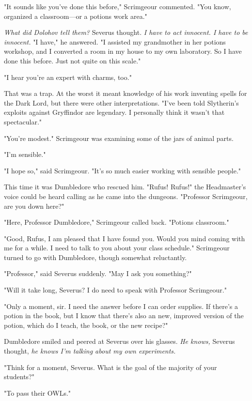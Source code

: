 "It sounds like you've done this before," Scrimgeour commented. "You know, organized a classroom—or a potions work area."

\emph{What did Dolohov tell them?} Severus thought. \emph{I have to act innocent. I have to be innocent.} "I have," he answered. "I assisted my grandmother in her potions workshop, and I converted a room in my house to my own laboratory. So I have done this before. Just not quite on this scale."

"I hear you're an expert with charms, too."

That was a trap. At the worst it meant knowledge of his work inventing spells for the Dark Lord, but there were other interpretations. "I've been told Slytherin's exploits against Gryffindor are legendary. I personally think it wasn't that spectacular."

"You're modest." Scrimgeour was examining some of the jars of animal parts.

"I'm sensible."

"I hope so," said Scrimgeour. "It's so much easier working with sensible people."

This time it was Dumbledore who rescued him. "Rufus! Rufus!" the Headmaster's voice could be heard calling as he came into the dungeons. "Professor Scrimgeour, are you down here?"

"Here, Professor Dumbledore," Scrimgeour called back. "Potions classroom."

"Good, Rufus, I am pleased that I have found you. Would you mind coming with me for a while. I need to talk to you about your class schedule." Scrimgeour turned to go with Dumbledore, though somewhat reluctantly.

"Professor," said Severus suddenly. "May I ask you something?"

"Will it take long, Severus? I do need to speak with Professor Scrimgeour."

"Only a moment, sir. I need the answer before I can order supplies. If there's a potion in the book, but I know that there's also an new, improved version of the potion, which do I teach, the book, or the new recipe?"

Dumbledore smiled and peered at Severus over his glasses. \emph{He knows,} Severus thought, \emph{he knows I'm talking about my own experiments.}

"Think for a moment, Severus. What is the goal of the majority of your students?"

"To pass their OWLs."

